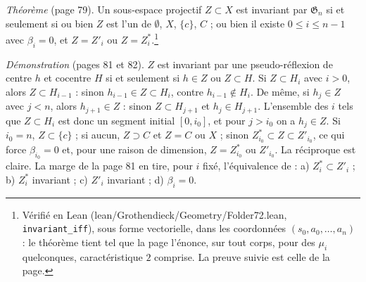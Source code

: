 \documentclass[11pt,a4paper]{article}
\begin{document}
\emph{Théorème} (page 79). Un sous-espace projectif $Z \subset X$ est invariant
par $\mathfrak{G}_n$ si et seulement si ou bien $Z$ est l'un de $\emptyset$,
$X$, $\{c\}$, $C$ ; ou bien il existe $0 \leqslant i \leqslant n-1$ avec $\beta_i
= 0$, et $Z = Z'_i$ ou $Z = Z^*_i$.\footnote{Vérifié en Lean
(lean/Grothendieck/Geometry/Folder72.lean, \texttt{invariant\_iff}), sous forme
vectorielle, dans les coordonnées $(s_0, a_0, \ldots, a_n)$ : le théorème tient
tel que la page l'énonce, sur tout corps, pour des $\mu_i$ quelconques,
caractéristique $2$ comprise. La preuve suivie est celle de la page.}

\emph{Démonstration} (pages 81 et 82). $Z$ est invariant par une
pseudo-réflexion de centre $h$ et cocentre $H$ si et seulement si $h \in Z$ ou $Z
\subset H$. Si $Z \subset H_i$ avec $i > 0$, alors $Z \subset H_{i-1}$ : sinon
$h_{i-1} \in Z \subset H_i$, contre $h_{i-1} \notin H_i$. De même, si $h_j \in Z$
avec $j < n$, alors $h_{j+1} \in Z$ : sinon $Z \subset H_{j+1}$ et $h_j \in
H_{j+1}$. L'ensemble des $i$ tels que $Z \subset H_i$ est donc un segment
initial $[0, i_0]$, et pour $j > i_0$ on a $h_j \in Z$. Si $i_0 = n$, $Z \subset
\{c\}$ ; si aucun, $Z \supset C$ et $Z = C$ ou $X$ ; sinon $Z^*_{i_0} \subset Z
\subset Z'_{i_0}$, ce qui force $\beta_{i_0} = 0$ et, pour une raison de
dimension, $Z = Z^*_{i_0}$ ou $Z'_{i_0}$. La réciproque est claire. La marge de
la page 81 en tire, pour $i$ fixé, l'équivalence de : a) $Z^*_i \subset Z'_i$ ; b)
$Z^*_i$ invariant ; c) $Z'_i$ invariant ; d) $\beta_i = 0$.
\end{document}

